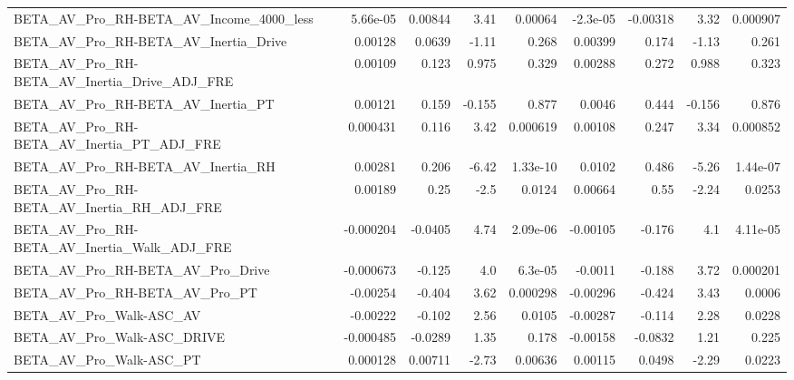 \begin{tabular}{lrrrrrrrr}
BETA\_AV\_Pro\_RH-BETA\_AV\_Income\_4000\_less            &    5.66e-05 &      0.00844 &     3.41 &  0.00064 &   -2.3e-05 &    -0.00318 &         3.32 &      0.000907 \\
BETA\_AV\_Pro\_RH-BETA\_AV\_Inertia\_Drive               &     0.00128 &       0.0639 &    -1.11 &    0.268 &    0.00399 &       0.174 &        -1.13 &         0.261 \\
BETA\_AV\_Pro\_RH-BETA\_AV\_Inertia\_Drive\_ADJ\_FRE       &     0.00109 &        0.123 &    0.975 &    0.329 &    0.00288 &       0.272 &        0.988 &         0.323 \\
BETA\_AV\_Pro\_RH-BETA\_AV\_Inertia\_PT                  &     0.00121 &        0.159 &   -0.155 &    0.877 &     0.0046 &       0.444 &       -0.156 &         0.876 \\
BETA\_AV\_Pro\_RH-BETA\_AV\_Inertia\_PT\_ADJ\_FRE          &    0.000431 &        0.116 &     3.42 & 0.000619 &    0.00108 &       0.247 &         3.34 &      0.000852 \\
BETA\_AV\_Pro\_RH-BETA\_AV\_Inertia\_RH                  &     0.00281 &        0.206 &    -6.42 & 1.33e-10 &     0.0102 &       0.486 &        -5.26 &      1.44e-07 \\
BETA\_AV\_Pro\_RH-BETA\_AV\_Inertia\_RH\_ADJ\_FRE          &     0.00189 &         0.25 &     -2.5 &   0.0124 &    0.00664 &        0.55 &        -2.24 &        0.0253 \\
BETA\_AV\_Pro\_RH-BETA\_AV\_Inertia\_Walk\_ADJ\_FRE        &   -0.000204 &      -0.0405 &     4.74 & 2.09e-06 &   -0.00105 &      -0.176 &          4.1 &      4.11e-05 \\
BETA\_AV\_Pro\_RH-BETA\_AV\_Pro\_Drive                   &   -0.000673 &       -0.125 &      4.0 &  6.3e-05 &    -0.0011 &      -0.188 &         3.72 &      0.000201 \\
BETA\_AV\_Pro\_RH-BETA\_AV\_Pro\_PT                      &    -0.00254 &       -0.404 &     3.62 & 0.000298 &   -0.00296 &      -0.424 &         3.43 &        0.0006 \\
BETA\_AV\_Pro\_Walk-ASC\_AV                            &    -0.00222 &       -0.102 &     2.56 &   0.0105 &   -0.00287 &      -0.114 &         2.28 &        0.0228 \\
BETA\_AV\_Pro\_Walk-ASC\_DRIVE                         &   -0.000485 &      -0.0289 &     1.35 &    0.178 &   -0.00158 &     -0.0832 &         1.21 &         0.225 \\
BETA\_AV\_Pro\_Walk-ASC\_PT                            &    0.000128 &      0.00711 &    -2.73 &  0.00636 &    0.00115 &      0.0498 &        -2.29 &        0.0223 \\

\end{tabular}
